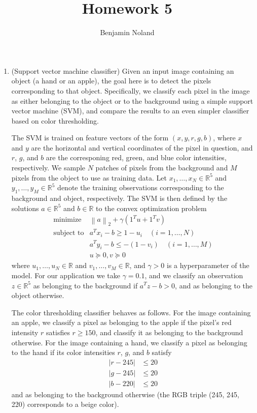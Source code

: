 \documentclass[letterpaper,12pt]{article}
\title{Homework 5}
\author{Benjamin Noland}
\date{}
\newcommand{\norm}[1]{\left\lVert#1\right\rVert}
\begin{document}
\maketitle

\begin{enumerate}
\item (Support vector machine classifier) Given an input image
  containing an object (a hand or an apple), the goal here is to
  detect the pixels corresponding to that object. Specifically, we
  classify each pixel in the image as either belonging to the object
  or to the background using a simple support vector machine (SVM),
  and compare the results to an even simpler classifier based on color
  thresholding.

  The SVM is trained on feature vectors of the form $(x, y, r, g, b)$,
  where $x$ and $y$ are the horizontal and vertical coordinates of the
  pixel in question, and $r$, $g$, and $b$ are the corresponing red,
  green, and blue color intensities, respectively. We sample $N$
  patches of pixels from the background and $M$ pixels from the object
  to use as training data. Let $x_1, \ldots, x_N \in \mathbb{R}^5$ and
  $y_1, \ldots, y_M \in \mathbb{R}^5$ denote the training observations
  corresponding to the background and object, respectively. The SVM is
  then defined by the solutions $a \in \mathbb{R}^5$ and
  $b \in \mathbb{R}$ to the convex optimization problem
  \begin{equation*}
    \begin{array}{ll}
      \text{minimize} & \norm{a}_2 + \gamma (1^Tu + 1^Tv) \\
      \text{subject to}
        & a^T x_i - b \geq 1 - u_i \quad (i = 1, \ldots, N) \\
        & a^T y_i - b \leq -(1 - v_i) \quad (i = 1, \ldots, M) \\
        & u \succeq 0, v \succeq 0
    \end{array}
  \end{equation*}
  where $u_1, \ldots, u_N \in \mathbb{R}$ and
  $v_1, \ldots, v_M \in \mathbb{R}$, and $\gamma > 0$ is a
  hyperparameter of the model. For our application we take
  $\gamma = 0.1$, and we classify an observation $z \in \mathbb{R}^5$
  as belonging to the background if $a^T z - b > 0$, and as belonging
  to the object otherwise.

  The color thresholding classifier behaves as follows. For the image
  containing an apple, we classify a pixel as belonging to the apple
  if the pixel's red intensity $r$ satisfies $r \geq 150$, and
  classify it as belonging to the background otherwise. For the image
  containing a hand, we classify a pixel as belonging to the hand if
  its color intensities $r$, $g$, and $b$ satisfy
  \begin{align*}
    |r - 245| &\leq 20 \\
    |g - 245| &\leq 20 \\
    |b - 220| &\leq 20
  \end{align*}
  and as belonging to the background otherwise (the RGB triple (245,
  245, 220) corresponds to a beige color).


\end{enumerate}
\end{document}

